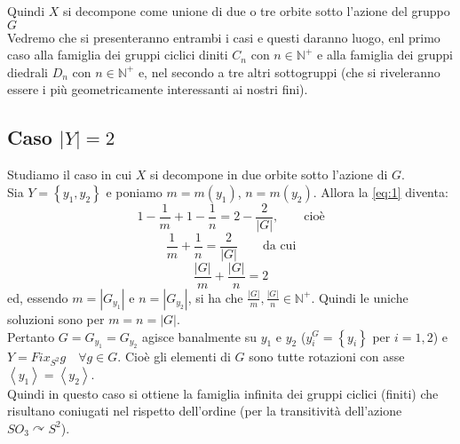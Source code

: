 Quindi $X$ si decompone come unione di due o tre orbite sotto l'azione del gruppo $G$\\
Vedremo che si presenteranno entrambi i casi e questi daranno luogo, enl primo caso alla famiglia dei gruppi ciclici diniti $C_n$
con $n\in\mathbb{N}^+$ e alla famiglia dei gruppi diedrali $D_n$ con $n\in\mathbb{N}^+$ e, nel secondo a tre altri sottogruppi
(che si riveleranno essere i pi\`u geometricamente interessanti ai nostri fini).
\subsection{Caso $\left|Y\right|=2$}
Studiamo il caso in cui $X$ si decompone in due orbite sotto l'azione di $G$.\\
Sia $Y=\left\{y_1,y_2\right\}$ e poniamo $m=m(y_1)$, $n=m(y_2)$. Allora la \ref{eq:1} diventa:
\begin{equation*}
1-\frac{1}{m}+1-\frac{1}{n}=2-\frac{2}{\left|G\right|},\qquad\text{cio\`e}
\end{equation*}
\begin{equation*}
\frac{1}{m}+\frac{1}{n}=\frac{2}{\left|G\right|}\qquad\text{da cui}
\end{equation*}
\begin{equation*}
\frac{\left|G\right|}{m}+\frac{\left|G\right|}{n}=2
\end{equation*}
ed, essendo $m=\left|G_{y_1}\right|$ e $n=\left|G_{y_2}\right|$,
si ha che $\frac{\left|G\right|}{m},\frac{\left|G\right|}{n}\in\mathbb{N}^+$.
Quindi le uniche soluzioni sono per $m=n=\left|G\right|$.\\
Pertanto $G=G_{y_1}=G_{y_2}$ agisce banalmente su $y_1$ e $y_2$ ($y_i^G=\left\{y_i\right\}$ per $i=1,2$) e
$Y=Fix_{S^2}g\quad\forall g\in G$. Cio\`e gli elementi di $G$ sono tutte rotazioni con asse $\left<y_1\right>=\left<y_2\right>$.\\
Quindi in questo caso si ottiene la famiglia infinita dei gruppi ciclici (finiti) che risultano coniugati nel rispetto dell'ordine
(per la transitivit\`a dell'azione $SO_3\curvearrowright S^2$).

